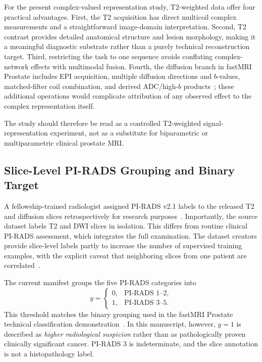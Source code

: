 For the present complex-valued representation study, T2-weighted data offer four practical advantages. First, the T2 acquisition has direct multicoil complex measurements and a straightforward image-domain interpretation. Second, T2 contrast provides detailed anatomical structure and lesion morphology, making it a meaningful diagnostic substrate rather than a purely technical reconstruction target. Third, restricting the task to one sequence avoids conflating complex-network effects with multimodal fusion. Fourth, the diffusion branch in fastMRI Prostate includes EPI acquisition, multiple diffusion directions and $b$-values, matched-filter coil combination, and derived ADC/high-$b$ products~\cite{Tibrewala2024FastMRIProstate}; these additional operations would complicate attribution of any observed effect to the complex representation itself.

The study should therefore be read as a controlled T2-weighted signal-representation experiment, not as a substitute for biparametric or multiparametric clinical prostate MRI.

\subsection{Slice-Level PI-RADS Grouping and Binary Target}\label{sec:labels}
A fellowship-trained radiologist assigned PI-RADS v2.1 labels to the released T2 and diffusion slices retrospectively for research purposes~\cite{Tibrewala2024FastMRIProstate}. Importantly, the source dataset labels T2 and DWI slices in isolation. This differs from routine clinical PI-RADS assessment, which integrates the full examination. The dataset creators provide slice-level labels partly to increase the number of supervised training examples, with the explicit caveat that neighboring slices from one patient are correlated~\cite{Tibrewala2024FastMRIProstate}.

The current manifest groups the five PI-RADS categories into
\begin{equation}
y=
\begin{cases}
0, & \text{PI-RADS }1\text{--}2,\\
1, & \text{PI-RADS }3\text{--}5.
\end{cases}
\label{eq:binary-label}
\end{equation}
This threshold matches the binary grouping used in the fastMRI Prostate technical classification demonstration~\cite{Tibrewala2024FastMRIProstate}. In this manuscript, however, $y=1$ is described as \emph{higher radiological suspicion} rather than as pathologically proven clinically significant cancer. PI-RADS 3 is indeterminate, and the slice annotation is not a histopathology label.

